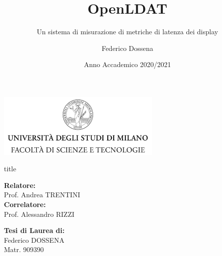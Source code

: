 \documentclass[xcolor={x11names}]{beamer}
\title{OpenLDAT}
\subtitle{Un sistema di misurazione di metriche di latenza dei display}
\author{Federico Dossena}
\date{Anno Accademico 2020/2021}
\newlength\leftsidebar
\begin{document}
\leftsidebar %
\begin{frame}[plain]
	\begin{minipage}{\textwidth+1\leftsidebar}
		\begin{center}
			\includegraphics[width=0.6\textwidth]{Logo.png}\\
		\end{center}
		\begin{beamercolorbox}[sep=12pt,center]{title}
			 \inserttitle\\
			\vspace{1mm}
			 \insertsubtitle
		\end{beamercolorbox}
		\begin{center}
			\begin{minipage}[t]{0.45\textwidth}
				\begin{flushleft}
					{\bf Relatore:}\\
					Prof. Andrea TRENTINI\\
					\vspace{2mm}
					{\bf Correlatore:}\\
					Prof. Alessandro RIZZI
				\end{flushleft}
			\end{minipage}
			\begin{minipage}[t]{0.45\textwidth}
				\begin{flushright}
					{\bf Tesi di Laurea di:}\\
					Federico DOSSENA\\
					Matr. 909390
				\end{flushright}
			\end{minipage}
		\end{center}
		\vspace{3mm}
		\begin{center}
			 \insertdate
		\end{center}
	\end{minipage}
\end{frame}
\end{document}
